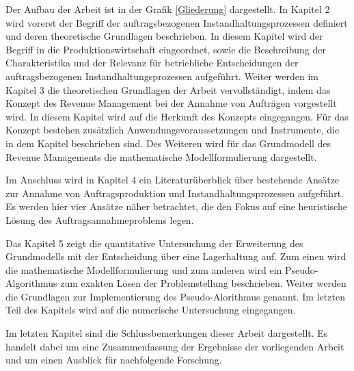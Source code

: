 Der Aufbau der Arbeit ist in der Grafik \ref{Gliederung} dargestellt. In Kapitel 2 wird vorerst der Begriff der auftragsbezogenen Instandhaltungsprozessen definiert und deren theoretische Grundlagen beschrieben. In diesem Kapitel wird der Begriff in die Produktionswirtschaft eingeordnet, sowie die Beschreibung der Charakteristika und der Relevanz für betriebliche Entscheidungen der auftragsbezogenen Instandhaltungsprozessen aufgeführt. Weiter werden im Kapitel 3 die theoretischen Grundlagen der Arbeit vervollständigt, indem das Konzept des Revenue Management bei der Annahme von Aufträgen vorgestellt wird. In diesem Kapitel wird auf die Herkunft des Konzepts eingegangen. Für das Konzept bestehen zusätzlich Anwendungsvoraussetzungen und Instrumente, die in dem Kapitel beschrieben sind. Des Weiteren wird für das Grundmodell des Revenue Managements die mathematische Modellformulierung dargestellt.

Im Anschluss wird in Kapitel 4 ein Literaturüberblick über bestehende Ansätze zur Annahme von Auftragsproduktion und Instandhaltungsprozessen aufgeführt. Es werden hier vier Ansätze näher betrachtet, die den Fokus auf eine heuristische Lösung des Auftragsannahmeproblems legen.

Das Kapitel 5 zeigt die quantitative Untersuchung der Erweiterung des Grundmodells mit der Entscheidung über eine Lagerhaltung auf. Zum einen wird die  mathematische Modellformulierung und zum anderen wird ein Pseudo-Algorithmus zum exakten Lösen der Problemstellung beschrieben. Weiter werden die Grundlagen zur Implementierung des Pseudo-Alorithmus genannt. Im letzten Teil des Kapitels wird auf die numerische Untersuchung eingegangen.

Im letzten Kapitel sind die Schlussbemerkungen dieser Arbeit dargestellt. Es handelt dabei um eine Zusammenfassung der Ergebnisse der vorliegenden Arbeit und um einen Ausblick für nachfolgende Forschung.